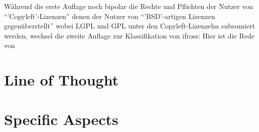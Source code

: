 \documentclass[DIV=calc,BCOR=5mm,11pt,headings=small,oneside,abstract=true, toc=bib]{scrartcl}
\begin{document}
Während die erste Auflage noch bipolar die Rechte und Pflichten
der Nutzer von \enquote{'Copyleft'-Lizenzen} denen der Nutzer von
\enquote{'BSD'-artigen Lizenzen gegenüberstellt} wobei LGPL und GPL unter
den Copyleft-Lizenzehn subsumiert werden, wechsel die zweite Auflage zur
Klassifikation von ifross: Hier ist die Rede von 

\section{Line of Thought}

\section{Specific Aspects}

\small

\end{document}
